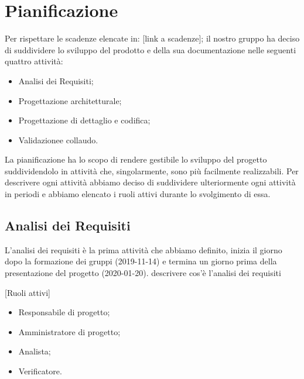 \section{Pianificazione} 
Per rispettare le scadenze elencate in: [link a scadenze]; il nostro gruppo ha deciso di suddividere lo sviluppo del prodotto e della sua documentazione nelle seguenti quattro attività:
\begin{itemize}
	[queste 4 sono attività]
	\item Analisi dei Requisiti;
	\item Progettazione architetturale;
	\item Progettazione di dettaglio e codifica;
	\item Validazione\glosp e collaudo.
\end{itemize}
La pianificazione ha lo scopo di rendere gestibile lo sviluppo del progetto suddividendolo in attività che, singolarmente, sono più facilmente realizzabili. Per descrivere ogni attività abbiamo deciso di suddividere ulteriormente ogni attività in periodi e abbiamo elencato i ruoli attivi durante lo svolgimento di essa.

\subsection{Analisi dei Requisiti}
L'analisi dei requisiti è la prima attività che abbiamo definito, inizia il giorno dopo la formazione dei gruppi (2019-11-14) e termina un giorno prima della presentazione del progetto (2020-01-20).
{descrivere cos'è l'analisi dei requisiti}

[Ruoli attivi]
\begin{itemize}
	\item Responsabile di progetto;
	\item Amministratore di progetto;
	\item Analista;
	\item Verificatore.
\end{itemize}

